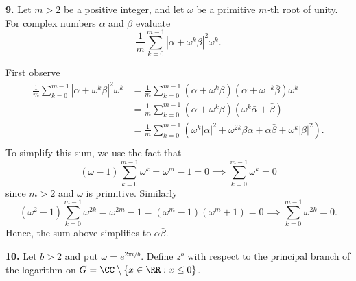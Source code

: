 \documentclass{homework}
\begin{document}
{\bf 9.} Let $m>2$ be a positive integer, and let $\omega$ be a primitive $m$-th root of unity.  For complex numbers $\alpha$ and $\beta$ evaluate
$$
  \frac 1m \sum_{k=0}^{m-1}|\alpha + \omega^k\beta|^2\omega^k.
$$
\begin{solution}
  First observe
  \begin{align*}
    \frac 1m \sum_{k=0}^{m-1}|\alpha + \omega^k\beta|^2\omega^k
    &= \frac 1m \sum_{k=0}^{m-1}(\alpha + \omega^k\beta)(\bar \alpha + \omega^{-k}\bar \beta)\omega^k\\
    &= \frac 1m \sum_{k=0}^{m-1}(\alpha + \omega^k\beta)(\omega^k\bar \alpha + \bar \beta)\\
    &= \frac 1m \sum_{k=0}^{m-1}\left(\omega^k|\alpha|^2 + \omega^{2k}\beta\bar\alpha + \alpha\bar\beta + \omega^k|\beta|^2 \right).\\
  \end{align*}
  To simplify this sum, we use the fact that
  $$
    (\omega -1) \sum_{k=0}^{m-1} \omega^k = \omega^m - 1 = 0 \implies \sum_{k=0}^{m-1} \omega^k = 0
  $$
  since $m>2$ and $\omega$ is primitive. Similarly
  $$
    (\omega^2 -1) \sum_{k=0}^{m-1} \omega^{2k} = \omega^{2m} - 1 = (\omega^m - 1)(\omega^m + 1) = 0\implies \sum_{k=0}^{m-1} \omega^{2k} = 0.
  $$
  Hence, the sum above simplifies to  $\alpha\bar \beta$.
\end{solution}

{\bf 10.} Let $b>2$ and put $\omega = e^{2\pi i/b}$.  Define $z^b$ with respect to the principal branch of the logarithm on $G = \CC \setminus \{x\in \RR : x \le 0\}$.
\end{document}
